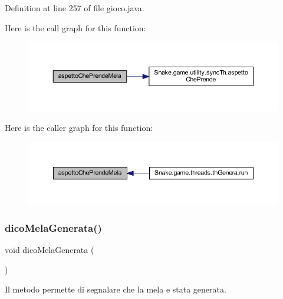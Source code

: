 Definition at line 257 of file gioco.\+java.

Here is the call graph for this function\+:
\nopagebreak
\begin{figure}[H]
\begin{center}
\leavevmode
\includegraphics[width=350pt]{class_snake_1_1game_1_1gioco_afe08c48d1322583ee9398d56ac218afa_cgraph}
\end{center}
\end{figure}
Here is the caller graph for this function\+:
\nopagebreak
\begin{figure}[H]
\begin{center}
\leavevmode
\includegraphics[width=350pt]{class_snake_1_1game_1_1gioco_afe08c48d1322583ee9398d56ac218afa_icgraph}
\end{center}
\end{figure}
\mbox{\label{class_snake_1_1game_1_1gioco_a0de00fa3994a64cc918edd5944ac2569}} 
\subsubsection{\texorpdfstring{dico\+Mela\+Generata()}{dicoMelaGenerata()}}
{\footnotesize\ttfamily void dico\+Mela\+Generata (\begin{DoxyParamCaption}{ }\end{DoxyParamCaption})}



Il metodo permette di segnalare che la mela e\textquotesingle{} stata generata. 



